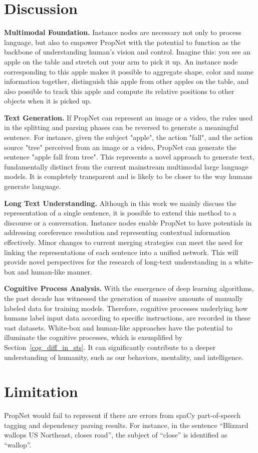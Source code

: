 \section{Discussion}

\textbf{Multimodal Foundation.} Instance nodes are necessary not only to process language, but also to empower PropNet with the potential to function as the backbone of understanding human's vision and control. Imagine this: you see an apple on the table and stretch out your arm to pick it up. An instance node corresponding to this apple makes it possible to aggregate shape, color and name information together, distinguish this apple from other apples on the table, and also possible to track this apple and compute its relative positions to other objects when it is picked up. 

\textbf{Text Generation.} If PropNet can represent an image or a video, the rules used in the splitting and parsing phases can be reversed to generate a meaningful sentence. For instance, given the subject "apple", the action "fall", and the action source "tree" perceived from an image or a video, PropNet can generate the sentence "apple fall from tree". This represents a novel approach to generate text, fundamentally distinct from the current mainstream multimodal large language models. It is completely transparent and is likely to be closer to the way humans generate language.

\textbf{Long Text Understanding.}  Although in this work we mainly discuss the representation of a single sentence, it is possible to extend this method to a discourse or a conversation. Instance nodes enable PropNet to have potentials in addressing coreference resolution and representing contextual information effectively. Minor changes to current merging strategies can meet the need for linking the representations of each sentence into a unified network. This will provide novel perspectives for the research of long-text understanding in a white-box and human-like manner.

\textbf{Cognitive Process Analysis.} With the emergence of deep learning algorithms, the past decade has witnessed the generation of massive amounts of manually labeled data for training models. Therefore, cognitive processes underlying how humans label input data according to specific instructions, are recorded in these vast datasets. White-box and human-like approaches have the potential to illuminate the cognitive processes, which is exemplified by Section~\ref{cog_diff_in_sts}. It can significantly contribute to a deeper understanding of humanity, such as our behaviors, mentality, and intelligence. 



\section{Limitation}

PropNet would fail to represent if there are errors from spaCy part-of-speech tagging and dependency parsing results. For instance, in the sentence ``Blizzard wallops US Northeast, closes road'', the subject of ``close'' is identified as ``wallop''.

